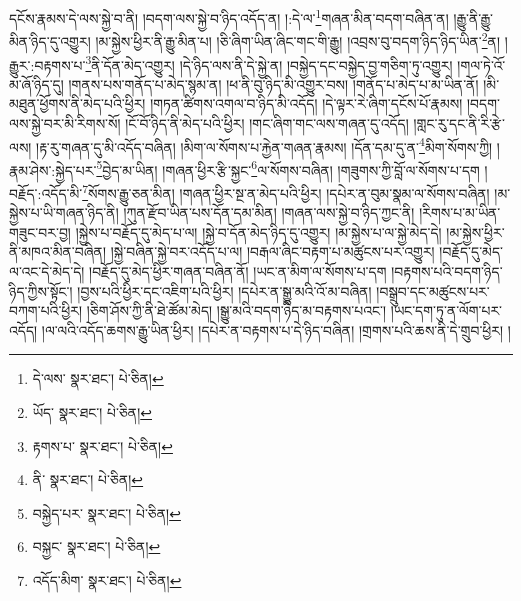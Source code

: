 དངོས་རྣམས་དེ་ལས་སྐྱེ་བ་ནི། །བདག་ལས་སྐྱེ་བ་ཉིད་འདོད་ན། །:དེ་ལ་\footnote{དེ་ལས་  སྣར་ཐང་།  པེ་ཅིན། }གཞན་མིན་བདག་བཞིན་ན། །རྒྱུ་ནི་རྒྱུ་མིན་ཉིད་དུ་འགྱུར། །མ་སྐྱེས་ཕྱིར་ནི་རྒྱུ་མིན་པ། །ཅི་ཞིག་ཡིན་ཞིང་གང་གི་རྒྱུ། །འབྲས་བུ་བདག་ཉིད་ཉིད་ཡིན་\footnote{ཡོད་  སྣར་ཐང་།  པེ་ཅིན། }ན། །རྒྱུར་:བརྟགས་པ་\footnote{རྟགས་པ་  སྣར་ཐང་།  པེ་ཅིན། }ནི་དོན་མེད་འགྱུར། །དེ་ཉིད་ལས་ནི་དེ་སྐྱེ་ན། །བསྐྱེད་དང་བསྐྱེད་བྱ་གཅིག་ཏུ་འགྱུར། །གལ་ཏེ་འོ་མ་ཞོ་ཉིད་དུ། །གནས་པས་གནོད་པ་མེད་སྙམ་ན། །ཕ་ནི་བུ་ཉིད་མི་འགྱུར་བས། །གནོད་པ་མེད་པ་མ་ཡིན་ནོ། །མི་མཐུན་ཕྱོགས་ནི་མེད་པའི་ཕྱིར། །གཏན་ཚིགས་འགལ་བ་ཉིད་མི་འདོད། །དེ་ལྟར་རེ་ཞིག་དངོས་པོ་རྣམས། །བདག་ལས་སྐྱེ་བར་མི་རིགས་སོ། །ངོ་བོ་ཉིད་ནི་མེད་པའི་ཕྱིར། །གང་ཞིག་གང་ལས་གཞན་དུ་འདོད། །གླང་རུ་དང་ནི་རི་རྩེ་ལས། །རྟ་རུ་གཞན་དུ་མི་འདོད་བཞིན། །མིག་ལ་སོགས་པ་རྐྱེན་གཞན་རྣམས། །དོན་དམ་དུ་ན་\footnote{ནི་  སྣར་ཐང་།  པེ་ཅིན། }མིག་སོགས་ཀྱི། །རྣམ་ཤེས་:སྐྱེད་པར་\footnote{བསྐྱེད་པར་  སྣར་ཐང་།  པེ་ཅིན། }བྱེད་མ་ཡིན། །གཞན་ཕྱིར་རྩི་སྐྱང་\footnote{བསྐྱང་  སྣར་ཐང་།  པེ་ཅིན། }ལ་སོགས་བཞིན། །གཟུགས་ཀྱི་བློ་ལ་སོགས་པ་དག །བརྗོད་:འདོད་མི་\footnote{འདོད་མིག་  སྣར་ཐང་།  པེ་ཅིན། }སོགས་རྒྱུ་ཅན་མིན། །གཞན་ཕྱིར་སྔ་ན་མེད་པའི་ཕྱིར། །དཔེར་ན་བུམ་སྣམ་ལ་སོགས་བཞིན། །མ་སྐྱེས་པ་ཡི་གཞན་ཉིད་ནི། །ཀུན་རྫོབ་ཡིན་པས་དོན་དམ་མིན། །གཞན་ལས་སྐྱེ་བ་ཉིད་ཀྱང་ནི། །རིགས་པ་མ་ཡིན་གཟུང་བར་བྱ། །སྐྱེས་པ་བརྗོད་དུ་མེད་པ་ལ། །སྐྱེ་བ་དོན་མེད་ཉིད་དུ་འགྱུར། །མ་སྐྱེས་པ་ལ་སྐྱེ་མེད་དེ། །མ་སྐྱེས་ཕྱིར་ནི་མཁའ་མིན་བཞིན། །སྐྱེ་བཞིན་སྐྱེ་བར་འདོད་པ་ལ། །བརྒལ་ཞིང་བརྟག་པ་མཚུངས་པར་འགྱུར། །བརྗོད་དུ་མེད་ལ་འང་དེ་མེད་དེ། །བརྗོད་དུ་མེད་ཕྱིར་གཞན་བཞིན་ནོ། །ཡང་ན་མིག་ལ་སོགས་པ་དག །བརྟགས་པའི་བདག་ཉིད་ཉིད་ཀྱིས་སྟོང་། །བྱས་པའི་ཕྱིར་དང་འཇིག་པའི་ཕྱིར། །དཔེར་ན་སྒྱུ་མའི་འོ་མ་བཞིན། །བསྒྲུབ་དང་མཚུངས་པར་བཀག་པའི་ཕྱིར། །ཅིག་ཤོས་ཀྱི་ནི་ཐེ་ཚོམ་མེད། །སྒྱུ་མའི་བདག་ཉིད་མ་བརྟགས་པའང་། །ཡང་དག་ཏུ་ན་ལོག་པར་འདོད། །ལ་ལའི་འདོད་ཆགས་རྒྱུ་ཡིན་ཕྱིར། །དཔེར་ན་བརྟགས་པ་དེ་ཉིད་བཞིན། །གྲགས་པའི་ཆས་ནི་དེ་གྲུབ་ཕྱིར། །
